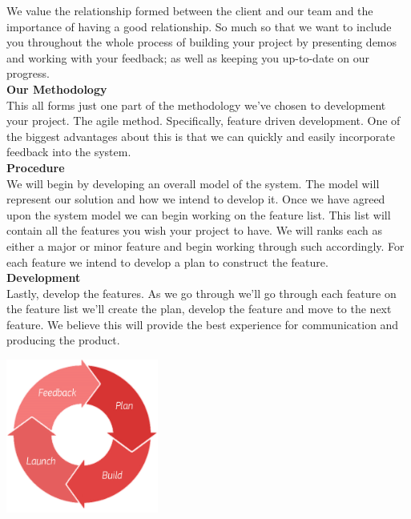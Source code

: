 We value the relationship formed between the client and our team and the importance of having a good relationship. So much so that we want to include you throughout the whole process of building your project by presenting demos and working with your feedback; as well as keeping you up-to-date on our progress.\\

\textbf{Our Methodology}\\
This all forms just one part of the methodology we've chosen to development your project. The agile method. Specifically, feature driven development. One of the biggest advantages about this is that we can quickly and easily incorporate feedback into the system.\\

\textbf{Procedure}\\
We will begin by developing an overall model of the system. The model will represent our solution and how we intend to develop it. Once we have agreed upon the system model we can begin working on the feature list. This list will contain all the features you wish your project to have. We will ranks each as either a major or minor feature and begin working through such accordingly. For each feature we intend to develop a plan to construct the feature.\\

\textbf{Development}\\ 
Lastly, develop the features. As we go through we'll go through each feature on the feature list we'll create the plan, develop the feature and move to the next feature. We believe this will provide the best experience for communication and producing the product.\\
\begin{center}
    \includegraphics[width=5cm]{../Common/agile.png}
\end{center}
\newpage

